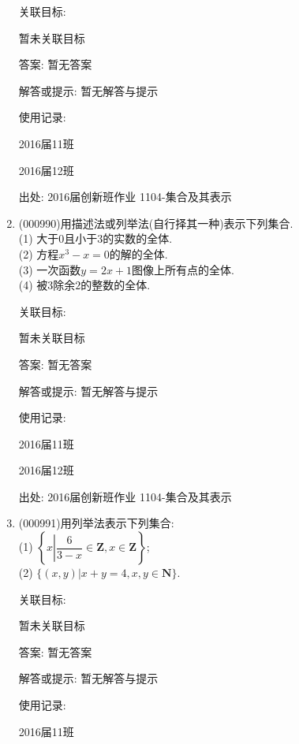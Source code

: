 \documentclass[10pt,a4paper]{article}
\begin{document}
\begin{enumerate}[1.]
关联目标:

暂未关联目标

答案: 暂无答案

解答或提示: 暂无解答与提示

使用记录:

2016届11班			

2016届12班			


出处: 2016届创新班作业	1104-集合及其表示
\item { (000990)}用描述法或列举法(自行择其一种)表示下列集合.\\ 
(1) 大于$0$且小于$3$的实数的全体.\\ 
(2) 方程$x^3-x=0$的解的全体.\\ 
(3) 一次函数$y=2x+1$图像上所有点的全体.\\ 
(4) 被$3$除余$2$的整数的全体.


关联目标:

暂未关联目标

答案: 暂无答案

解答或提示: 暂无解答与提示

使用记录:

2016届11班				

2016届12班				


出处: 2016届创新班作业	1104-集合及其表示
\item { (000991)}用列举法表示下列集合:\\ 
(1) $\left\{x\left| \dfrac{6}{3-x}\in\mathbf{Z},x\in\mathbf{Z}\right.\right\}$;\\ 
(2) $\{(x,y)|x+y=4,x,y\in\mathbf{N}\}$.


关联目标:

暂未关联目标

答案: 暂无答案

解答或提示: 暂无解答与提示

使用记录:

2016届11班		


\end{enumerate}
\end{document}
